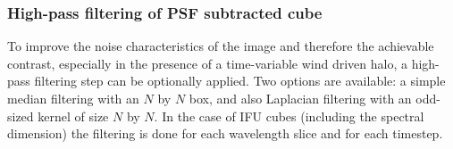 \subsubsection{High-pass filtering of PSF subtracted cube}
\label{adi_highfilt}
To improve the noise characteristics of the image and therefore the achievable contrast, especially in the presence of a time-variable wind driven halo, a high-pass filtering step can be optionally applied. Two options are available: a simple median filtering with an $N$ by $N$ box, and also Laplacian filtering with an odd-sized kernel of size $N$ by $N$. In the case of IFU cubes (including the spectral dimension) the filtering is done for each wavelength slice and for each timestep.

